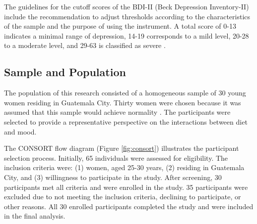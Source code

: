 \documentclass[jou]{apa7}
\begin{document}
The guidelines for the cutoff scores of the BDI-II (Beck Depression Inventory-II) include the recommendation to adjust thresholds according to the characteristics of the sample and the purpose of using the instrument. A total score of 0-13 indicates a minimal range of depression, 14-19 corresponds to a mild level, 20-28 to a moderate level, and 29-63 is classified as severe \parencite{beckBeckDepressionInventory2011}.


\subsection{Sample and Population}\label{muestra-y-poblaciuxf3n}

The population of this research consisted of a homogeneous sample of 30 young women residing in Guatemala City. Thirty women were chosen because it was assumed that this sample would achieve normality \parencite{Hernandez2018}. The participants were selected to provide a representative perspective on the interactions between diet and mood.

The CONSORT flow diagram (Figure \ref{fig:consort}) illustrates the participant selection process. Initially, 65 individuals were assessed for eligibility. The inclusion criteria were: (1) women, aged 25-30 years, (2) residing in Guatemala City, and (3) willingness to participate in the study. After screening, 30 participants met all criteria and were enrolled in the study. 35 participants were excluded due to not meeting the inclusion criteria, declining to participate, or other reasons. All 30 enrolled participants completed the study and were included in the final analysis.
\end{document}
